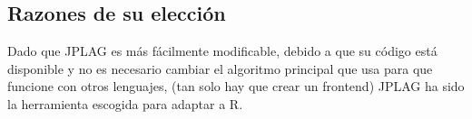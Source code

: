 \subsection{Razones de su elección}
Dado que JPLAG es más fácilmente modificable, debido a que su código está disponible y no es necesario cambiar el algoritmo principal que usa para que funcione con otros lenguajes, (tan solo hay que crear un frontend) JPLAG ha sido la herramienta escogida para adaptar a R.


